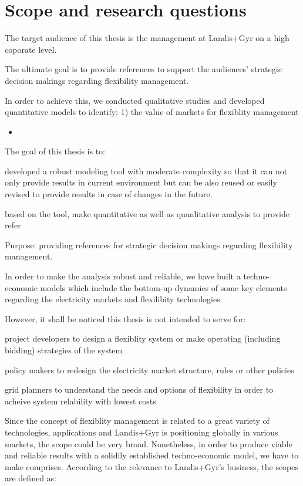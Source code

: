 \section{Scope and research questions}

The target audience of this thesis is the management at Landis+Gyr on a high coporate level.

The ultimate goal is to provide references to support the audiences' strategic decision makings regarding flexibility management.

In order to achieve this, we conducted qualitative studies and developed quantitative models to identify: 1) the value of markets for flexiblity management

\begin{itemize}
	\item 
\end{itemize}

The goal of this thesis is to:

developed a robust modeling tool with moderate complexity so that it can not only provide results in current environment but can be also reused or easily revised to provide results in case of changes in the future.

based on the tool, make quantitative as well as quanlitative analysis to provide refer 

Purpose: providing references for strategic decision makings regarding flexibility management.

In order to make the analysis robust and reliable, we have built a techno-economic models which include the bottom-up dynamics of some key elements regarding the electricity markets and flexilibity technologies. 

However, it shall be noticed this thesis is not intended to serve for:

project developers to design a flexiblity system or make operating (including bidding) strategies of the system

policy makers to redesign the electricity market structure, rules or other policies

grid planners to understand the needs and options of flexibility in order to acheive system relability with lowest costs


Since the concept of flexiblity management is related to a great variety of technologies, applications and Landis+Gyr is positioning globally in various markets, the scope could be very broad. Nonetheless, in order to produce viable and reliable results with a solidily established techno-economic model, we have to make comprises. According to the relevance to Landis+Gyr's business, the scopes are defined as:

